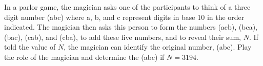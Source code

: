 In a parlor game, the magician asks one of the participants to think of a three digit number (abc) where a, b, and c represent digits in base 10 in the order indicated. The magician then asks this person to form the numbers (acb), (bca), (bac), (cab), and (cba), to add these five numbers, and to reveal their sum, $N$. If told the value of $N$, the magician can identify the original number, (abc). Play the role of the magician and determine the (abc) if $N= 3194$.